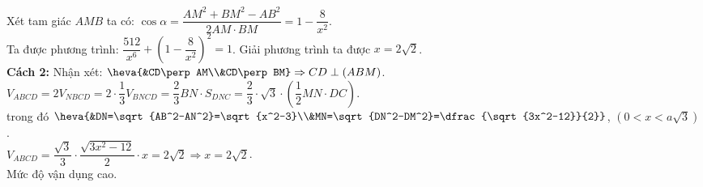 \begin{ex}
{\begin{center}
		\end{center}
		Xét tam giác $AMB$ ta có: $\cos\alpha=\dfrac{AM^2+BM^2-AB^2}{2AM\cdot BM}=1-\dfrac{8}{x^2}$.\\
		Ta được phương trình: $\dfrac{512}{x^6}+\left(1-\dfrac{8}{x^2}\right)^2=1$. Giải phương trình ta được $x=2\sqrt{2}$.\\
		\textbf{Cách 2:} Nhận xét: $\heva{&CD\perp AM\\&CD\perp BM}\Rightarrow CD\perp\left( ABM\right) $.\\
		$V_{ABCD}=2V_{NBCD}=2\cdot\dfrac{1}{3}V_{BNCD}=\dfrac{2}{3}BN\cdot S_{DNC}=\dfrac{2}{3}\cdot\sqrt{3}\cdot\left(\dfrac{1}{2}MN\cdot DC\right)$.\\
		trong đó $\heva{&DN=\sqrt{AB^2-AN^2}=\sqrt{x^2-3}\\&MN=\sqrt{DN^2-DM^2}=\dfrac{\sqrt{3x^2-12}}{2}}$, $\left(0<x<a\sqrt{3}\right)$.\\
		$V_{ABCD}=\dfrac{\sqrt{3}}{3}\cdot\dfrac{\sqrt{3x^2-12}}{2}\cdot x=2\sqrt{2}\Rightarrow x=2\sqrt{2}$.\\
		Mức độ vận dụng cao.}
\end{ex}
